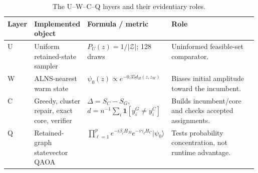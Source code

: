 \begin{table}[t]
\centering
\caption{The \textsc{U--W--C--Q} layers and their evidentiary roles.}
\label{tab:uwcq}
\scriptsize
\begin{tabularx}{\linewidth}{@{}p{0.07\linewidth}p{0.20\linewidth}p{0.31\linewidth}X@{}}
\toprule
Layer & Implemented object & Formula / metric & Role \\
\midrule
U & Uniform retained-state sampler & $P_U(z)=1/|\mathcal Z|$; 128 draws & Uninformed feasible-set comparator. \\
W & ALNS-nearest warm state & $\psi_0(z)\propto e^{-0.35d_H(z,z_W)}$ & Biases initial amplitude toward the incumbent. \\
C & Greedy, cluster repair, exact core, verifier & $\Delta=S_C-S_G$, $d=n^{-1}\sum_i\mathbf1[y_i^G\ne y_i^C]$ & Builds incumbent/core and checks accepted assignments. \\
Q & Retained-graph statevector QAOA & $\prod_{\ell=1}^p e^{-i\beta_\ell H_M}e^{-i\gamma_\ell H_C}|\psi_0\rangle$ & Tests probability concentration, not runtime advantage. \\
\bottomrule
\end{tabularx}
\end{table}
